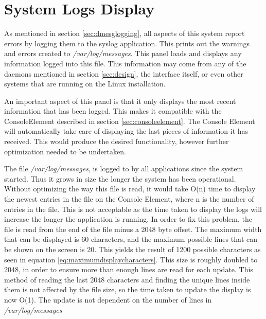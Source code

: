 
\section{System Logs Display}

As mentioned in section \ref{sec:dmesglogging}, all aspects of this system report errors by logging them to the syslog application. This prints out the warnings and errors created to \emph{/var/log/messages}. This panel loads and displays any information logged into this file. This information may come from any of the daemons mentioned in section \ref{sec:design}, the interface itself, or even other systems that are running on the Linux installation.


An important aspect of this panel is that it only displays the most recent information that has been logged. This makes it compatible with the ConsoleElement described in section \ref{sec:consoleelement}. The Console Element will automatically take care of displaying the last pieces of information it has received. This would produce the desired functionality, however further optimization needed to be undertaken.

The file \emph{/var/log/messages}, is logged to by all applications since the system started. Thus it grows in size the longer the system has been operational. Without optimizing the way this file is read, it would take O(n) time to display the newest entries in the file on the Console Element, where n is the number of entries in the file. This is not acceptable as the time taken to display the logs will increase the longer the application is running. In order to fix this problem, the file is read from the end of the file minus a 2048 byte offset.  The maximum width that can be displayed is 60 characters, and the maximum possible lines that can be shown on the screen is 20. This yields the result of 1200 possible characters as seen in equation \ref{eq:maximumdisplaycharacters}. This size is roughly doubled to 2048, in order to ensure more than enough lines are read for each update. This method of reading the last 2048 characters and finding the unique lines inside them is not affected by the file size, so the time taken to update the display is now O(1). The update is not dependent on the number of lines in \emph{/var/log/messages}

